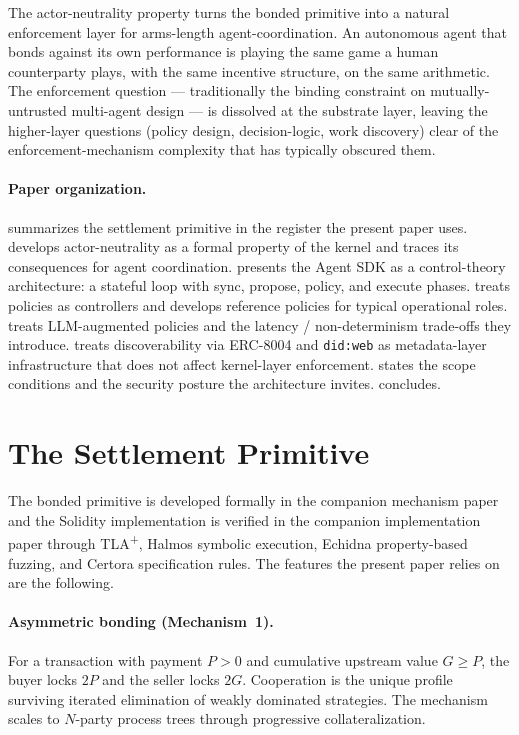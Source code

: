 \documentclass[11pt,a4paper]{article}
\theoremstyle{definition}
\theoremstyle{remark}
\newcommand{\pay}{P}
\newcommand{\cumval}{G}
\begin{document}
The actor-neutrality property turns the bonded primitive into a
natural enforcement layer for arms-length agent-coordination. An
autonomous agent that bonds against its own performance is
playing the same game a human counterparty plays, with the same
incentive structure, on the same arithmetic. The enforcement
question --- traditionally the binding constraint on
mutually-untrusted multi-agent design --- is dissolved at the
substrate layer, leaving the higher-layer questions (policy
design, decision-logic, work discovery) clear of the
enforcement-mechanism complexity that has typically obscured them.

\paragraph{Paper organization.}
 summarizes the settlement primitive in the
register the present paper uses.
 develops actor-neutrality as a
formal property of the kernel and traces its consequences for
agent coordination.
 presents the Agent SDK as a control-theory
architecture: a stateful loop with sync, propose, policy, and
execute phases.
 treats policies as controllers and develops
reference policies for typical operational roles.
 treats LLM-augmented policies and the latency /
non-determinism trade-offs they introduce.
 treats discoverability via ERC-8004
and \texttt{did:web} as metadata-layer infrastructure that does
not affect kernel-layer enforcement.
 states the scope conditions and the security
posture the architecture invites.
 concludes.

\section{The Settlement Primitive}
\label{sec:primitive}

The bonded primitive is developed formally in the companion
mechanism paper and the Solidity implementation is verified in
the companion implementation paper through TLA\textsuperscript{+},
Halmos symbolic execution, Echidna property-based fuzzing, and
Certora specification rules. The features the present paper
relies on are the following.

\paragraph{Asymmetric bonding (Mechanism~1).}
For a transaction with payment $\pay > 0$ and cumulative upstream
value $\cumval \geq \pay$, the buyer locks $2\pay$ and the seller
locks $2\cumval$. Cooperation is the unique profile surviving
iterated elimination of weakly dominated strategies. The mechanism
scales to $N$-party process trees through progressive
collateralization.
\end{document}
